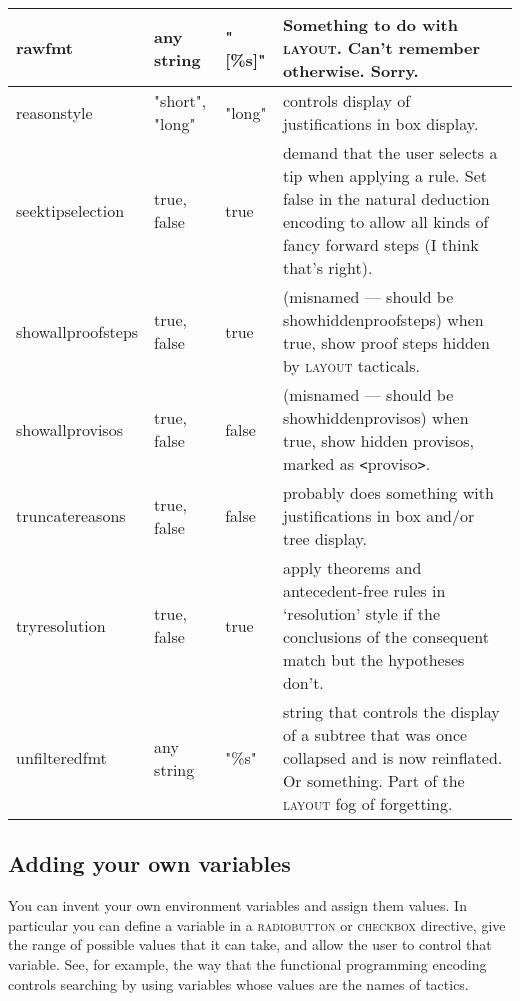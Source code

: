 \begin{longtable}{|l|p{2cm}|l|p{2.5in}|}
rawfmt & any string & "{[}\%s{]}"  & Something to do with \textsc{layout}. Can't remember otherwise. Sorry.\\ \hline

reasonstyle & "short", "long" & "long" & controls display of justifications in box display.\\ \hline

seektipselection & true, false & true & demand that the user selects a tip when applying a rule. Set false in the natural deduction encoding to allow all kinds of fancy forward steps (I think that's right).\\ \hline

{\raggedright showallproofsteps} & {\raggedright true, false} & {\raggedright true} & {\raggedright (misnamed --- should be showhiddenproofsteps) when true, show proof steps hidden by \textsc{layout} tacticals.}\\
\hline
{\raggedright showallprovisos} & {\raggedright true, false} & {\raggedright false} & {\raggedright (misnamed --- should be showhiddenprovisos) when true, show hidden provisos, marked as \texttt{<}proviso\texttt{>}.}\\
\hline

truncatereasons & true, false & false & probably does something with justifications in box and/or tree display.\\ \hline

{\raggedright tryresolution} & {\raggedright true, false} & {\raggedright true} & {\raggedright apply theorems and antecedent-free rules in `resolution' style if the conclusions of the consequent match but the hypotheses don't.}\\
\hline
{\raggedright unfilteredfmt} & {\raggedright any string} & {\raggedright "\%s"} & {\raggedright string that controls the display of a subtree that was once collapsed and is now reinflated. Or something. Part of the \textsc{layout} fog of forgetting.}\\
\hline
\end{longtable}


\subsection{Adding your own variables}


You can invent your own environment variables and assign them values. In particular you can define a variable in a \textsc{radiobutton} or \textsc{checkbox} directive, give the range of possible values that it can take, and allow the user to control that variable. See, for example, the way that the functional programming encoding controls searching by using variables whose values are the names of tactics.


